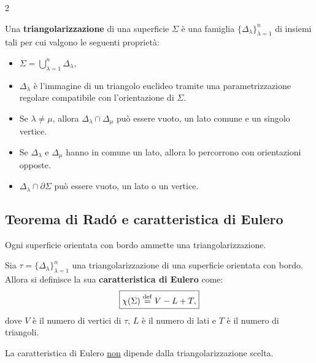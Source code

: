 \begin{multicols*}{2}
    \begin{definition}[Triangolarizzazione]
        Una \textbf{triangolarizzazione} di una superficie $\Sigma$ è una famiglia
        $\{ \Delta_\lambda \}_{\lambda=1}^n$ di insiemi tali per cui valgono
        le seguenti proprietà:
        \begin{itemize}
            \item $\Sigma = \bigcup_{\lambda=1}^n \Delta_\lambda$,
            \item $\Delta_\lambda$ è l'immagine di un triangolo euclideo tramite una
                  parametrizzazione regolare compatibile con l'orientazione
                  di $\Sigma$.
            \item Se $\lambda \neq \mu$, allora $\Delta_\lambda \cap \Delta_\mu$ può essere
                  vuoto, un lato comune e un singolo vertice.
            \item Se $\Delta_\lambda$ e $\Delta_\mu$ hanno in comune un lato, allora lo percorrono con
                  orientazioni opposte.
            \item $\Delta_\lambda \cap \partial \Sigma$ può essere vuoto, un lato o un vertice.
        \end{itemize}
    \end{definition}

    \subsection{Teorema di Radó e caratteristica di Eulero}

    \begin{theorem}[Radó] \label{thm:rado}
        Ogni superficie orientata con bordo ammette una triangolarizzazione.
    \end{theorem}

    \begin{definition}
        Sia $\tau = \{ \Delta_\lambda \}_{\lambda=1}^n$ una triangolarizzazione di
        una superficie orientata con bordo. Allora si definisce la sua
        \textbf{caratteristica di Eulero} come:
        \[
            \boxed{\chi(\Sigma) \overset{\mathrm{def}}{=} V - L + T,}
        \]
        dove $V$ è il numero di vertici di $\tau$, $L$ è il numero di lati e
        $T$ è il numero di triangoli.
    \end{definition}

    \begin{fact}
        La caratteristica di Eulero \underline{non} dipende dalla
        triangolarizzazione scelta.
    \end{fact}


\end{multicols*}

